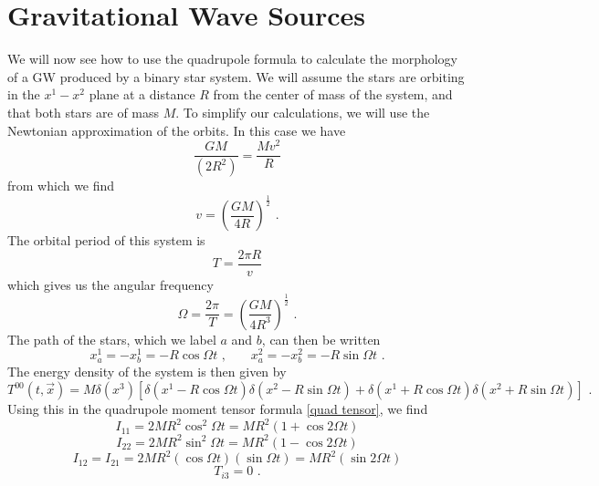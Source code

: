 \documentclass[11pt]{cuthesis}
\newcommand{\fs}{\text{ .}}
\begin{document}
\section{Gravitational Wave Sources}
We will now see how to use the quadrupole formula to calculate the morphology of a GW produced by a binary star system. We will assume the stars are orbiting in the $x^1-x^2$ plane at a distance $R$ from the center of mass of the system, and that both stars are of mass $M$. To simplify our calculations, we will use the Newtonian approximation of the orbits. In this case we have 
\begin{equation}
\frac{GM}{(2R^2)} = \frac{Mv^2}{R}
\end{equation}
from which we find
\begin{equation}
v=\left( \frac{GM}{4R} \right)^\frac{1}{2} \fs
\end{equation}
The orbital period of this system is
\begin{equation}
T=\frac{2\pi R}{v}
\end{equation}
which gives us the angular frequency
\begin{equation}
\Omega = \frac{2\pi}{T} = \left(\frac{GM}{4R^3}\right)^\frac{1}{2} \fs
\end{equation}
The path of the stars, which we label $a$ and $b$, can then be written 
\begin{equation}
x_a^1 = -x_b^1 = -R\cos \Omega t \text{  ,  } \hspace{20pt} x_a^2 = -x_b^2 = -R\sin \Omega t \fs 
\end{equation}
The energy density of the system is then given by
\begin{equation}
T^{00}(t,\vec{x}) = M \delta(x^3) [ \delta(x^1 - R\cos\Omega t ) \delta( x^2 - R\sin \Omega t ) +  \delta(x^1 + R\cos\Omega t ) \delta( x^2 + R\sin \Omega t ) ] \fs
\end{equation}
Using this in the quadrupole moment tensor formula \ref{quad tensor}, we find
\begin{equation}
I_{11} = 2MR^2 \cos^2 \Omega t = MR^2 (1+\cos 2\Omega t)
\end{equation}
\begin{equation}
I_{22} = 2MR^2 \sin^2 \Omega t = MR^2 (1-\cos 2\Omega t)
\end{equation}
\begin{equation}
I_{12} = I_{21} = 2MR^2 (\cos \Omega t)(\sin \Omega t) = MR^2 (\sin 2\Omega t)
\end{equation}
\begin{equation}
T_{i3} = 0 \fs
\end{equation}
\end{document}
